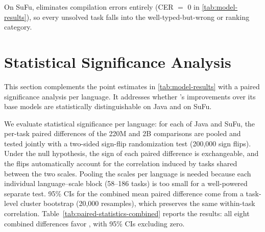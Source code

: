 On SuFu, \mainname eliminates compilation errors entirely (CER $=$ 0 in \autoref{tab:model-results}), so every unsolved task falls into the well-typed-but-wrong or ranking category.

\section{Statistical Significance Analysis}
\label{appendix-statistics}

This section complements the point estimates in \autoref{tab:model-results} with a paired significance analysis per language. It addresses whether \mainname's improvements over its base models are statistically distinguishable on Java and on SuFu.

We evaluate statistical significance per language: for each of Java and SuFu, the per-task paired differences of the 220M and 2B comparisons are pooled and tested jointly with a two-sided sign-flip randomization test (200,000 sign flips). Under the null hypothesis, the sign of each paired difference is exchangeable, and the flips automatically account for the correlation induced by tasks shared between the two scales. Pooling the scales per language is needed because each individual language--scale block (58--186 tasks) is too small for a well-powered separate test. 95\% CIs for the combined mean paired difference come from a task-level cluster bootstrap (20,000 resamples), which preserves the same within-task correlation. Table~\ref{tab:paired-statistics-combined} reports the results: all eight combined differences favor \mainname{}, with 95\% CIs excluding zero.

